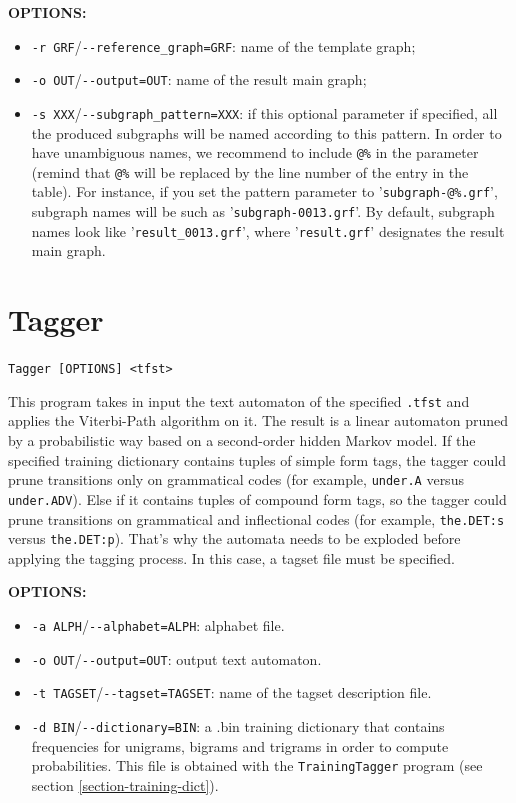 \bigskip
\noindent \textbf{OPTIONS:}
\begin{itemize}
  \item \verb+-r GRF+/\verb+--reference_graph=GRF+: name of the template graph;
  
  \item \verb+-o OUT+/\verb+--output=OUT+: name of the result main graph;
  
  \item \verb+-s XXX+/\verb+--subgraph_pattern=XXX+: if this optional parameter
  if specified, all the produced subgraphs will be named according to this pattern. 
  In order to have unambiguous names, we recommend to include \verb+@%+ in the parameter 
  (remind that \verb+@%+ will be replaced by the line number of the entry in the table). 
  For instance, if you set the pattern parameter to '\verb+subgraph-@%.grf+', 
  subgraph names will be such as '\verb+subgraph-0013.grf+'. By default,
  subgraph names look like '\verb+result_0013.grf+', where '\verb+result.grf+' 
  designates the result main graph.
\end{itemize}






\section{Tagger}
\verb+Tagger [OPTIONS] <tfst>+

\bigskip
\noindent This program takes in input the text automaton of the specified \verb+.tfst+ and applies
the Viterbi-Path algorithm on it. The result is a linear automaton pruned by a probabilistic way based on
a second-order hidden Markov model. If the specified training dictionary contains tuples of simple form tags,
the tagger could prune transitions only on grammatical codes (for example, \verb+under.A+ versus \verb+under.ADV+).
Else if it contains tuples of compound form tags, so the tagger could prune transitions on grammatical 
and inflectional codes (for example, \verb+the.DET:s+ versus \verb+the.DET:p+). That's why the automata needs to be 
exploded before applying the tagging process. In this case, a tagset file must be specified.

\bigskip
\noindent \textbf{OPTIONS:}
\begin{itemize}
  \item \verb+-a ALPH+/\verb+--alphabet=ALPH+: alphabet file.
  \item \verb+-o OUT+/\verb+--output=OUT+: output text automaton.
  \item \verb+-t TAGSET+/\verb+--tagset=TAGSET+: name of the tagset description file.
  \item \verb+-d BIN+/\verb+--dictionary=BIN+: a .bin training dictionary that contains frequencies 
  for unigrams, bigrams and trigrams in order to compute probabilities. This file is obtained with 
  the \verb+TrainingTagger+ program (see section \ref{section-training-dict}).
\end{itemize}





